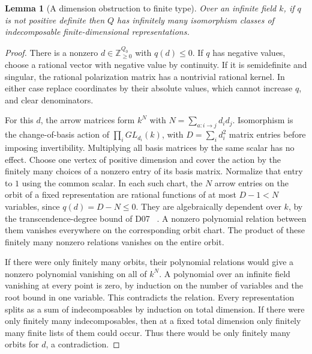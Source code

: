 \documentclass[11pt,oneside,openany]{book}
\newtheorem{lemma}[theorem]{Lemma}
\theoremstyle{definition}
\theoremstyle{remark}
\begin{document}
\begin{lemma}[A dimension obstruction to finite type]
\label{res:QU06}
Over an infinite field \(k\), if \(q\) is not positive definite
then \(Q\) has infinitely many isomorphism classes of
indecomposable finite-dimensional representations.
\end{lemma}
\begin{proof}
There is a nonzero \(d\in\mathbb Z_{\ge0}^{Q_0}\) with \(q(d)\le0\).
If \(q\) has negative values, choose a rational vector with
negative value by continuity. If it is semidefinite and singular,
the rational polarization matrix has a nontrivial rational
kernel. In either case replace coordinates by their absolute
values, which cannot increase \(q\), and clear denominators.

For this \(d\), the arrow matrices form \(k^N\) with
\(N=\sum_{a:i\to j}d_i d_j\). Isomorphism is the change-of-basis
action of \(\prod_i GL_{d_i}(k)\), with \(D=\sum_i d_i^2\)
matrix entries before imposing invertibility. Multiplying all
basis matrices by the same scalar has no effect. Choose one
vertex of positive dimension and cover the action by the finitely
many choices of a nonzero entry of its basis matrix. Normalize
that entry to \(1\) using the common scalar. In each such chart,
the \(N\) arrow entries on the orbit of a fixed representation
are rational functions of at most \(D-1<N\) variables, since
\(q(d)=D-N\le0\). They are algebraically dependent over \(k\),
by the transcendence-degree bound of D07
~\cite[Theorem 21.35, PDF p.~176]{mg-d07}.
A nonzero polynomial relation between them vanishes everywhere on
the corresponding orbit chart. The product of these finitely
many nonzero relations vanishes on the entire orbit.

If there were only finitely many orbits, their polynomial
relations would give a nonzero polynomial vanishing on all of
\(k^N\). A polynomial over an infinite field vanishing at every
point is zero, by induction on the number of variables and the
root bound in one variable. This contradicts the relation.
Every representation splits as a sum of indecomposables by
induction on total dimension. If there were only finitely many
indecomposables, then at a fixed total dimension only finitely
many finite lists of them could occur. Thus there would be
only finitely many orbits for \(d\), a contradiction.
\end{proof}
\end{document}

